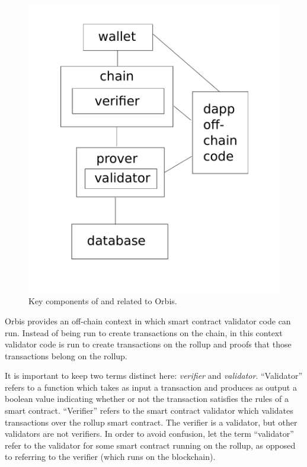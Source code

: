 \documentclass[12pt]{article}
\begin{document}
\begin{figure}
	\includegraphics[width=1.0\columnwidth]{system-diagram.pdf}
	\caption{Key components of and related to Orbis.}
	\label{fig:system-diagram}
\end{figure}

Orbis provides an off-chain context in which smart contract validator code can run. Instead of being run to create transactions on the chain, in this context validator code is run to create transactions on the rollup and proofs that those transactions belong on the rollup.

It is important to keep two terms distinct here: \emph{verifier}\/ and \emph{validator}. ``Validator'' refers to a function which takes as input a transaction and produces as output a boolean value indicating whether or not the transaction satisfies the rules of a smart contract. ``Verifier'' refers to the smart contract validator which validates transactions over the rollup smart contract. The verifier is a validator, but other validators are not verifiers. In order to avoid confusion, let the term ``validator'' refer to the validator for some smart contract running on the rollup, as opposed to referring to the verifier (which runs on the blockchain).
\end{document}
